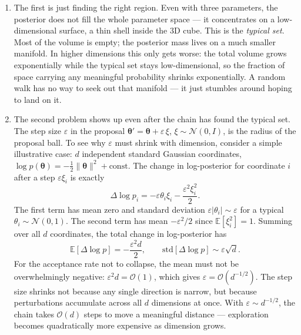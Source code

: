 \documentclass{article}
\renewcommand{\v}[1]{ \ensuremath{ {\mathbf{#1}} }}
\begin{document}
\begin{enumerate}

\item The first is just finding the right region. Even with three parameters, the posterior does not fill the whole parameter space — it concentrates on a low-dimensional surface, a thin shell inside the 3D cube. This is the \textit{typical set}. Most of the volume is empty; the posterior mass lives on a much smaller manifold. In higher dimensions this only gets worse: the total volume grows exponentially while the typical set stays low-dimensional, so the fraction of space carrying any meaningful probability shrinks exponentially. A random walk has no way to seek out that manifold — it just stumbles around hoping to land on it.

\item The second problem shows up even after the chain has found the typical set. The step size $\varepsilon$ in the proposal $\v\theta' = \v\theta + \varepsilon\,\xi$, $\xi \sim \mathcal{N}(0, I)$, is the radius of the proposal ball. To see why $\varepsilon$ must shrink with dimension, consider a simple illustrative case: $d$ independent standard Gaussian coordinates, $\log p(\v\theta) = -\tfrac{1}{2}\|\v\theta\|^2 + \text{const}$. The change in log-posterior for coordinate $i$ after a step $\varepsilon\xi_i$ is exactly
\begin{equation}
    \Delta\log p_i = -\varepsilon\theta_i\xi_i - \frac{\varepsilon^2\xi_i^2}{2}.
\end{equation}
The first term has mean zero and standard deviation $\varepsilon|\theta_i| \sim \varepsilon$ for a typical $\theta_i \sim \mathcal{N}(0,1)$. The second term has mean $-\varepsilon^2/2$ since $\mathbb{E}[\xi_i^2] = 1$. Summing over all $d$ coordinates, the total change in log-posterior has
\begin{equation}
    \mathbb{E}[\Delta\log p] = -\frac{\varepsilon^2 d}{2}, \qquad \mathrm{std}[\Delta\log p] \sim \varepsilon\sqrt{d}.
\end{equation}
For the acceptance rate not to collapse, the mean must not be overwhelmingly negative: $\varepsilon^2 d = \mathcal{O}(1)$, which gives $\varepsilon = \mathcal{O}(d^{-1/2})$. The step size shrinks not because any single direction is narrow, but because perturbations accumulate across all $d$ dimensions at once. With $\varepsilon \sim d^{-1/2}$, the chain takes $\mathcal{O}(d)$ steps to move a meaningful distance — exploration becomes quadratically more expensive as dimension grows.

\end{enumerate}
\end{document}
